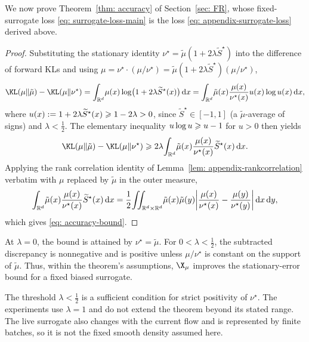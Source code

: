 \documentclass{article}
\begin{document}
We now prove Theorem~\ref{thm: accuracy} of Section~\ref{sec: FR}, whose fixed-surrogate loss \eqref{eq: surrogate-loss-main} is the loss \eqref{eq: appendix-surrogate-loss} derived above.

\begin{proof}
Substituting the stationary identity $\nu^\star = \tilde\mu(1+2\lambda\widetilde S^\star)$ into the difference of forward KLs and using $\mu = \nu^\star \cdot (\mu/\nu^\star) = \tilde\mu(1+2\lambda\widetilde S^\star)(\mu/\nu^\star)$,
\begin{equation*}
    \KL(\mu\|\tilde\mu) - \KL(\mu\|\nu^\star)
    = \int_{\mathbb R^d}\!\mu(x)\log\bigl(1 + 2\lambda\widetilde S^\star(x)\bigr)\D x
    = \int_{\mathbb R^d}\!\tilde\mu(x) \frac{\mu(x)}{\nu^\star(x)}u(x)\log u(x)\D x,
\end{equation*}
where $u(x) := 1 + 2\lambda\widetilde S^\star(x) \geqslant 1 - 2\lambda > 0$, since $\widetilde S^\star \in [-1, 1]$ (a $\tilde\mu$-average of signs) and $\lambda < \frac12$. The elementary inequality $u\log u \geqslant u - 1$ for $u > 0$ then yields
\begin{equation*}
    \KL(\mu\|\tilde\mu) - \KL(\mu\|\nu^\star)
    \Ge 2\lambda\!\int_{\mathbb R^d}\!\tilde\mu(x) \frac{\mu(x)}{\nu^\star(x)} \widetilde S^\star(x)\D x.
\end{equation*}
Applying the rank correlation identity of Lemma~\ref{lem: appendix-rankcorrelation} verbatim with $\mu$ replaced by $\tilde\mu$ in the outer measure,
\begin{equation*}
    \int_{\mathbb R^d}\!\tilde\mu(x)\frac{\mu(x)}{\nu^\star(x)}\widetilde S^\star(x)\,\mathrm d x = \frac{1}{2}\!\iint_{\mathbb R^d\times\mathbb R^d}\!\tilde\mu(x)\tilde\mu(y) \biggl|\frac{\mu(x)}{\nu^\star(x)} - \frac{\mu(y)}{\nu^\star(y)}\biggr|\,\mathrm d x\,\mathrm d y,
\end{equation*}
which gives \eqref{eq: accuracy-bound}.
\end{proof}

At $\lambda=0$, the bound is attained by $\nu^\star=\tilde\mu$. For $0<\lambda<\frac12$, the subtracted discrepancy is nonnegative and is positive unless $\mu/\nu^\star$ is constant on the support of $\tilde\mu$. Thus, within the theorem's assumptions, $\X_\mu$ improves the stationary-error bound for a fixed biased surrogate.

The threshold $\lambda<\frac12$ is a sufficient condition for strict positivity of $\nu^\star$. The experiments use $\lambda=1$ and do not extend the theorem beyond its stated range. The live surrogate also changes with the current flow and is represented by finite batches, so it is not the fixed smooth density assumed here.
\end{document}

